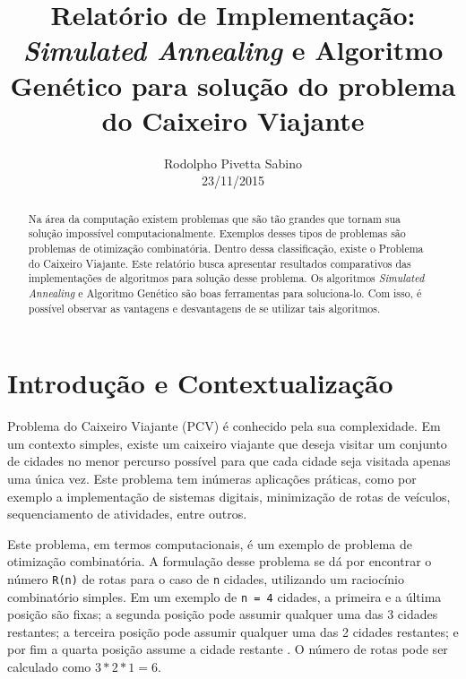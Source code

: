 \documentclass[journal, a4paper]{IEEEtran}
\begin{document}
	\title{Relatório de Implementação: \textit{Simulated Annealing} e Algoritmo Genético para solução do problema do Caixeiro Viajante}
	\author{
		Rodolpho Pivetta Sabino

		23/11/2015}
	\maketitle

\begin{abstract}
	Na área da computação existem problemas que são tão grandes que tornam sua solução impossível computacionalmente. Exemplos desses tipos de problemas são problemas de otimização combinatória. Dentro dessa classificação, existe o Problema do Caixeiro Viajante. Este relatório busca apresentar resultados comparativos das implementações de algoritmos para solução desse problema. Os algoritmos \textit{Simulated Annealing} e Algoritmo Genético são boas ferramentas para soluciona-lo. Com isso, é possível observar as vantagens e desvantagens de se utilizar tais algoritmos.
\end{abstract}

\section{Introdução e Contextualização}
	 Problema do Caixeiro Viajante (PCV) é conhecido pela sua complexidade. Em um contexto simples, existe um caixeiro viajante que deseja visitar um conjunto de cidades no menor percurso possível para que cada cidade seja visitada apenas uma única vez. Este problema tem inúmeras aplicações práticas, como por exemplo a implementação de sistemas digitais, minimização de rotas de veículos, sequenciamento de atividades, entre outros.

    Este problema, em termos computacionais, é um exemplo de problema de otimização combinatória. A formulação desse problema se dá por encontrar o número \texttt{R(n)} de rotas para o caso de \texttt{n} cidades, utilizando um raciocínio combinatório simples. Em um exemplo de \texttt{n = 4} cidades, a primeira e a última posição são fixas; a segunda posição pode assumir qualquer uma das 3 cidades restantes; a terceira posição pode assumir qualquer uma das 2 cidades restantes; e por fim a quarta posição assume a cidade restante \cite{portocv}. O número de rotas pode ser calculado como $3 * 2 * 1 = 6$.
\end{document}
